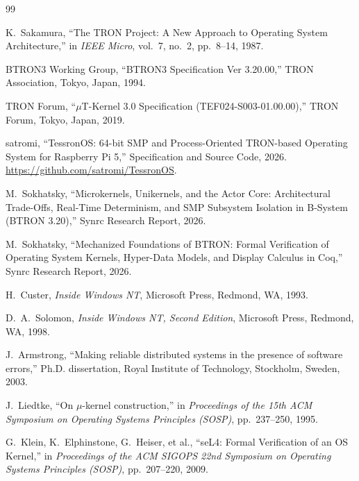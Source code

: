 \documentclass[10pt,journal,compsoc,twocolumn]{article}
\begin{document}
\begin{thebibliography}{99}

K.~Sakamura, ``The TRON Project: A New Approach to Operating System Architecture,'' in \emph{IEEE Micro}, vol.~7, no.~2, pp.~8--14, 1987.

BTRON3 Working Group, ``BTRON3 Specification Ver 3.20.00,'' TRON Association, Tokyo, Japan, 1994.

TRON Forum, ``$\mu$T-Kernel 3.0 Specification (TEF024-S003-01.00.00),'' TRON Forum, Tokyo, Japan, 2019.

satromi, ``TessronOS: 64-bit SMP and Process-Oriented TRON-based Operating System for Raspberry Pi 5,'' Specification and Source Code, 2026. \url{https://github.com/satromi/TessronOS}.

M.~Sokhatsky, ``Microkernels, Unikernels, and the Actor Core: Architectural Trade-Offs, Real-Time Determinism, and SMP Subsystem Isolation in B-System (BTRON 3.20),'' Synrc Research Report, 2026.

M.~Sokhatsky, ``Mechanized Foundations of BTRON: Formal Verification of Operating System Kernels, Hyper-Data Models, and Display Calculus in Coq,'' Synrc Research Report, 2026.

H.~Custer, \emph{Inside Windows NT}, Microsoft Press, Redmond, WA, 1993.

D.~A.~Solomon, \emph{Inside Windows NT, Second Edition}, Microsoft Press, Redmond, WA, 1998.

J.~Armstrong, ``Making reliable distributed systems in the presence of software errors,'' Ph.D. dissertation, Royal Institute of Technology, Stockholm, Sweden, 2003.

J.~Liedtke, ``On $\mu$-kernel construction,'' in \emph{Proceedings of the 15th ACM Symposium on Operating Systems Principles (SOSP)}, pp.~237--250, 1995.

G.~Klein, K.~Elphinstone, G.~Heiser, et al., ``seL4: Formal Verification of an OS Kernel,'' in \emph{Proceedings of the ACM SIGOPS 22nd Symposium on Operating Systems Principles (SOSP)}, pp.~207--220, 2009.

\end{thebibliography}
\end{document}
